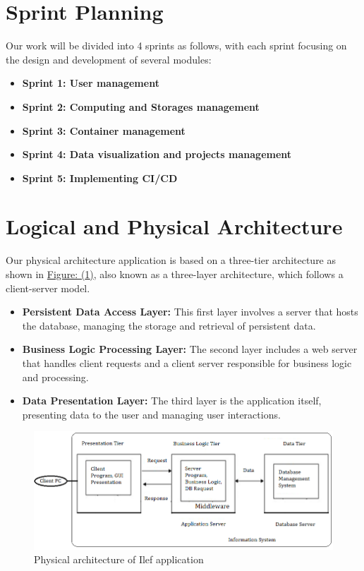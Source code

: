 \section{Sprint Planning}
Our work will be divided into 4 sprints as follows, with each sprint focusing on the design and development of several modules:
\begin{itemize}
  \item \textbf{Sprint 1: User management}
  \item \textbf{Sprint 2: Computing and Storages management}
  \item \textbf{Sprint 3: Container management}
  \item \textbf{Sprint 4: Data visualization and projects management}
  \item \textbf{Sprint 5: Implementing CI/CD}
\end{itemize}


\section{Logical and Physical Architecture}

Our physical architecture application is based on a three-tier architecture as shown in \hyperref[fig:archi-phy]{Figure: (\ref{fig:archi-phy})}, also known as a three-layer architecture, which follows a client-server model.
\begin{itemize}
  \item \textbf{Persistent Data Access Layer:}  This first layer involves a server that hosts the database, managing the storage and retrieval of persistent data.
  \item \textbf{Business Logic Processing Layer:}  The second layer includes a web server that handles client requests and a client server responsible for business logic and processing.
  \item \textbf{Data Presentation Layer:}   The third layer is the application itself, presenting data to the user and managing user interactions.
\end{itemize}

\begin{figure}[h]
  \center
  \includegraphics[width=17cm]{./chapters/preliminary_study/archi-phy.png}
  \caption{Physical architecture of Ilef application}
  \label{fig:archi-phy}
\end{figure}



